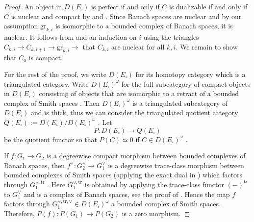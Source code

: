 \documentclass[a4paper,10pt]{amsart}
\theoremstyle{remark}
\theoremstyle{definition}
\theoremstyle{plain}
\numberwithin{equation}{section}
\newcommand{\trace}{\mathrm{tr}}
\begin{document}
\begin{proof}
An object in $D(E_{\square})$ is perfect if and only if $C$ is dualizable if and only if $C$ is nuclear and compact by 
\cite[Prop.~9.3]{scholze2022complex} and
\cite[Lem.~5.46, Cor.~5.51.1]{andreychev2021pseudocoherent}. Since Banach spaces are nuclear \cite[Prop.~3.29]{rodrigues2022solid} and by our assumption $\mathrm{gr}_{k,i}$ is isomorphic to a bounded complex of Banach spaces, it is nuclear. It follows from \cite[Lem.~5.40]{andreychev2021pseudocoherent} and an induction on $i$ using the triangles $C_{k,i}\rightarrow C_{k,i+1}\rightarrow \mathrm{gr}_{k,i}\rightarrow$ that $C_{k,i}$ are nuclear for all $k,i$. We remain to show that $C_0$ is compact.

For the rest of the proof, we write $D(E_{\square})$ for its homotopy category which is a triangulated category. Write $D(E_{\square})^{\omega}$ for the full subcategory of compact objects in $D(E_{\square})$ consisting of objects that are isomorphic to a retract of a bounded complex of Smith spaces \cite[Lem.~5.36]{andreychev2021pseudocoherent}. Then $D(E_{\square})^{\omega}$ is a triangulated subcategory of $D(E_{\square})$ \cite[Lem.~5.40]{andreychev2021pseudocoherent} and is thick, thus we can consider the triangulated quotient category $Q(E_{\square}):=D(E_{\square})/D(E_{\square})^{\omega}$ \cite[\href{https://stacks.math.columbia.edu/tag/05RA}{Tag 05RA}]{stacks-project}. Let 
\[P:D(E_{\square})\rightarrow Q(E_{\square})\] 
be the quotient functor so that $P(C)\simeq 0$ if $C\in D(E_{\square})^{\omega}$ \cite[\href{https://stacks.math.columbia.edu/tag/05RK}{Tag 05RK}]{stacks-project}. 

If $f:G_1\rightarrow G_2$ is a degreewise compact morphism between bounded complexes of Banach spaces, then $f^{\vee}: G_2^{\vee}\rightarrow G_1^{\vee}$ is a degreewise trace-class morphism between bounded complexes of Smith spaces (applying the exact dual in \cite[Thm.~3.40(1)]{rodrigues2022solid}) which factors through $G_1^{\vee,\mathrm{tr}}$ \cite[Lem.~A.14]{bosco2023rationalpadicHodge}. Here $G_1^{\vee,\mathrm{tr}}$ is obtained by applying the trace-class functor $(-)^{\trace}$ \cite[Def.~A.13]{bosco2023rationalpadicHodge} to $G_1^{\vee}$ and is a complex of Banach spaces, see the proof of \cite[Lem.~A.58]{bosco2021drinfeldproetale}. Hence the map $f$ factors through $G_1^{\vee,\mathrm{tr},\vee}\in D(E_{\square})^{\omega}$ a bounded complex of Smith spaces. Therefore, $P(f):P(G_1)\rightarrow P(G_2)$ is a zero morphism.


\end{proof}
\end{document}

